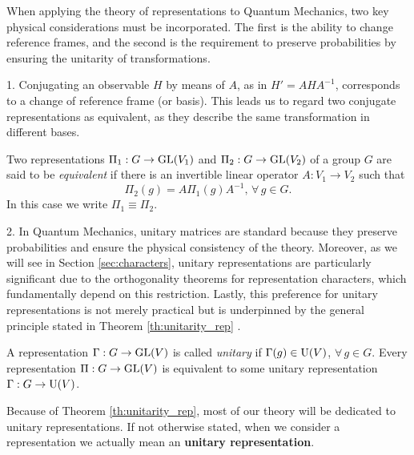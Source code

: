 When applying the theory of representations to Quantum Mechanics, two key physical considerations must be incorporated. The first is the ability to change reference frames, and the second is the requirement to preserve probabilities by ensuring the unitarity of transformations.

\n

1. Conjugating an observable $H$ by means of $A$, as in $H' = A H A^{-1}$, corresponds to a change of reference frame (or basis). This leads us to regard two conjugate representations as equivalent, as they describe the same transformation in different bases.

\begin{definition}
Two representations $\Pi_1: G \to {\text{GL}}(V_1)$ and $\Pi_2: G \to {\text{GL}}(V_2)$ of a group $G$ are said to be \textit{equivalent} if there is an invertible linear operator $A: V_1 \to V_2$ such that
\begin{equation} \label{eq:intertwiner}
\Pi_2(g) = A \Pi_1(g) A^{-1}, \, \forall \, g \in G.
\end{equation}
In this case we write $\Pi_1 \equiv \Pi_2$.
\end{definition}

2. In Quantum Mechanics, unitary matrices are standard because they preserve probabilities and ensure the physical consistency of the theory. Moreover, as we will see in Section \ref{sec:characters}, unitary representations are particularly significant due to the orthogonality theorems for representation characters, which fundamentally depend on this restriction. Lastly, this preference for unitary representations is not merely practical but is underpinned by the general principle stated in Theorem \ref{th:unitarity_rep} \cite{dresselhaus}.

\begin{theorem} \label{th:unitarity_rep}
A representation $\Gamma: G \to {\text{GL}}(V)$ is called \textit{unitary} if $\Gamma(g) \in {\text{U}}(V)$, $\forall \, g \in G$. Every representation $\Pi: G \to {\text{GL}}(V)$ is equivalent to some unitary representation $\Gamma: G \to {\text{U}}(V)$.
\end{theorem}

Because of Theorem \ref{th:unitarity_rep}, most of our theory will be dedicated to unitary representations. If not otherwise stated, when we consider a representation we actually mean an \textbf{unitary representation}.

